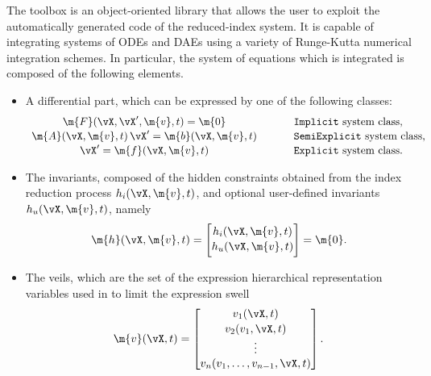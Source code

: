 The \Indigo{} \Matlab{} toolbox is an object-oriented library that allows the user to exploit the automatically generated code of the reduced-index system. It is capable of integrating systems of \acp{ODE} and \acp{DAE} using a variety of Runge-Kutta numerical integration schemes. In particular, the system of equations which is integrated is composed of the following elements.
%
\begin{itemize}
  \setlength{\itemsep}{0pt}
    \item A differential part, which can be expressed by one of the following classes:
    \begin{equation}
        \begin{array}{ccl}
            \m{F}(\vX, \vX^\prime, \m{v}, t) = \m{0} & \hspace{0.5cm} &
            \text{\texttt{Implicit} system class,} \\[0.5mm]
            \m{A}(\vX, \m{v}, t) \, \vX^\prime = \m{b}(\vX, \m{v}, t) & \hspace{0.5cm} &
            \text{\texttt{SemiExplicit} system class,} \\[0.5mm]
            \vX^\prime = \m{f}(\vX, \m{v}, t) & \hspace{0.5cm} &
            \text{\texttt{Explicit} system class.}
        \end{array}
    \end{equation}
    \item The invariants, composed of the hidden constraints obtained from the index reduction process $h_{i}(\vX, \m{v}, t)$, and optional user-defined invariants $h_{u}(\vX, \m{v}, t)$, namely
    \begin{equation}
        \label{chap6:eq:inv_part}
        \m{h}(\vX, \m{v}, t) = \begin{bmatrix}
            h_{i}(\vX, \m{v}, t) \\[0.5mm]
            h_{u}(\vX, \m{v}, t) \\[0.5mm]
        \end{bmatrix} = \m{0} \text{.}
    \end{equation}
    \item The veils, which are the set of the expression hierarchical representation variables used in \LEM{} to limit the expression swell
    \begin{equation}
        \m{v}(\vX, t) = \begin{bmatrix}
            v_{1}(\vX, t) \\[0.5mm]
            v_{2}(v_{1}, \vX, t) \\
            \vdots \\
            v_{n}(v_{1}, \dots, v_{n-1}, \vX, t)
        \end{bmatrix} \text{.}
    \end{equation}
\end{itemize}

